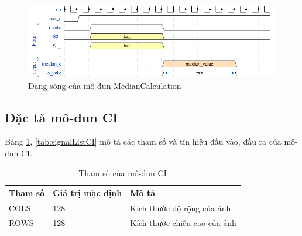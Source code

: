 \begin{figure}[!ht]
    \centering
    \includegraphics[width=\linewidth]{figures/medianCalculation.png}
    \caption{Dạng sóng của mô-đun MedianCalculation}
    \label{fig:medianCalculation}
\end{figure}
\subsection{Đặc tả mô-đun CI}
Bảng \ref{tab:paramListCI}, \ref{tab:signalListCI} mô tả các tham số và tín hiệu đầu vào, đầu ra của mô-đun CI.

\begin{table}[!ht]
    \centering
    \renewcommand{\arraystretch}{1.3} %
        \caption{Tham số của mô-đun CI}
    \begin{tabular}{|p{3cm} p{4cm} p{8cm}|}
        \hline
        \rowcolor{gray!30}
        \textbf{Tham số } & \textbf{Giá trị mặc định}  & \textbf{Mô tả} \\
        \hline
        COLS & 128 & Kích thước độ rộng của ảnh
        \\ \hline
        ROWS & 128 & Kích thước chiều cao của ảnh
        \\
        \hline
    \end{tabular}

    \label{tab:paramListCI}
\end{table}

